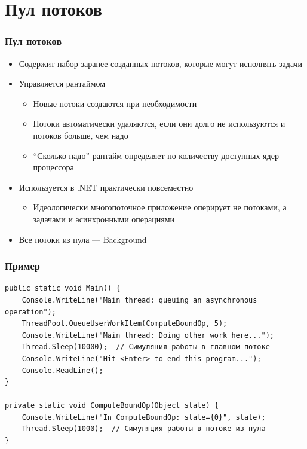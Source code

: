 \documentclass[xetex,mathserif,serif]{beamer}
\begin{document}
	\section{Пул потоков}

	\begin{frame}
		\frametitle{Пул потоков}
		\begin{itemize}
			\item Содержит набор заранее созданных потоков, которые могут исполнять задачи
			\item Управляется рантаймом
			\begin{itemize}
				\item Новые потоки создаются при необходимости
				\item Потоки автоматически удаляются, если они долго не используются и потоков больше, чем надо
				\item ``Сколько надо'' рантайм определяет по количеству доступных ядер процессора
			\end{itemize}
			\item Используется в .NET практически повсеместно
			\begin{itemize}
				\item Идеологически многопоточное приложение оперирует не потоками, а задачами и асинхронными операциями
			\end{itemize}
			\item Все потоки из пула --- Background
		\end{itemize}
	\end{frame}

	\begin{frame}[fragile]
		\frametitle{Пример}
		\begin{verbatim}
public static void Main() {
    Console.WriteLine("Main thread: queuing an asynchronous operation");
    ThreadPool.QueueUserWorkItem(ComputeBoundOp, 5);
    Console.WriteLine("Main thread: Doing other work here...");
    Thread.Sleep(10000);  // Симуляция работы в главном потоке
    Console.WriteLine("Hit <Enter> to end this program...");
    Console.ReadLine();
}

private static void ComputeBoundOp(Object state) {
    Console.WriteLine("In ComputeBoundOp: state={0}", state);
    Thread.Sleep(1000);  // Симуляция работы в потоке из пула
}
		\end{verbatim}
	\end{frame}
\end{document}
